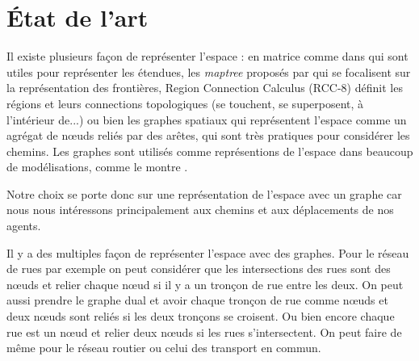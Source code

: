 \documentclass[a4paper]{article}
\begin{document}
\section{État de l'art}
\label{etat}

Il existe plusieurs façon de représenter l'espace : en matrice comme dans
\cite{batty1999} qui sont utiles pour représenter les étendues, les
\emph{maptree} proposés par \cite{worboys2012} qui se focalisent sur la
représentation des frontières, Region Connection Calculus (RCC-8)
\cite{randell1992} définit les régions et leurs connections topologiques (se
touchent, se superposent, à l'intérieur de...) ou bien les graphes spatiaux qui
représentent l'espace comme un agrégat de nœuds reliés par des arêtes, qui sont
très pratiques pour considérer les chemins. Les graphes sont utilisés comme
représentions de l'espace dans beaucoup de modélisations, comme le montre
\cite{dale2010}.

Notre choix se porte donc sur une représentation de l'espace avec un graphe car
nous nous intéressons principalement aux chemins et aux déplacements de nos
agents.

Il y a des multiples façon de représenter l'espace avec des graphes. Pour le
réseau de rues par exemple on peut considérer que les intersections des rues
sont des nœuds et relier chaque nœud si il y a un tronçon de rue entre les
deux. On peut aussi prendre le graphe dual et
avoir chaque tronçon de rue comme nœuds et deux nœuds sont reliés si les deux
tronçons se croisent. Ou bien encore chaque rue est un nœud et relier deux nœuds
si les rues s'intersectent. On peut faire de même pour le réseau routier ou
celui des transport en commun.
\end{document}
